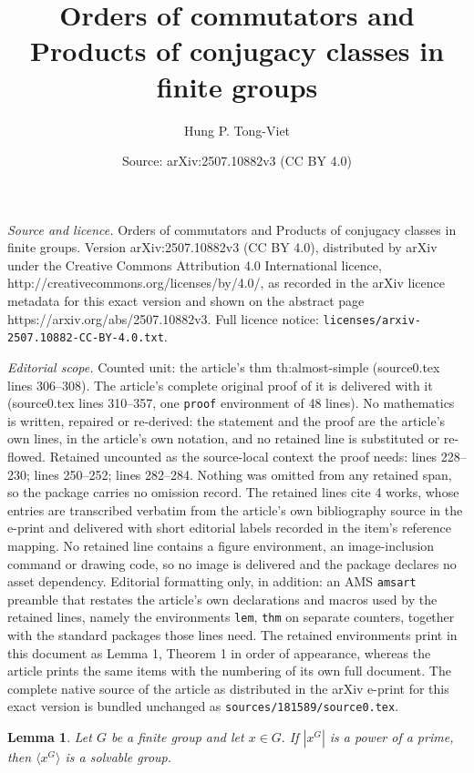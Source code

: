 \documentclass[10pt,a4paper]{amsart}
\title{Orders of commutators and Products of conjugacy classes in finite groups}
\author{Hung P. Tong-Viet}
\date{Source: arXiv:2507.10882v3 (CC BY 4.0)}
\newtheorem{lem}{Lemma}
\newcommand{\la}{\langle}
\newcommand{\ra}{\rangle}
\begin{document}
\maketitle

\noindent\emph{Source and licence.} Orders of commutators and Products of conjugacy classes in finite groups. Version arXiv:2507.10882v3 (CC BY 4.0), distributed by arXiv under the Creative Commons Attribution 4.0 International licence, http://creativecommons.org/licenses/by/4.0/, as recorded in the arXiv licence metadata for this exact version and shown on the abstract page https://arxiv.org/abs/2507.10882v3. Full licence notice: \texttt{licenses/arxiv-2507.10882-CC-BY-4.0.txt}.\par\smallskip

\noindent\textit{Editorial scope.} Counted unit: the article's thm th:almost-simple (source0.tex lines 306--308). The article's complete original proof of it is delivered with it (source0.tex lines 310--357, one \texttt{proof} environment of 48 lines). No mathematics is written, repaired or re-derived: the statement and the proof are the article's own lines, in the article's own notation, and no retained line is substituted or re-flowed.  Retained uncounted as the source-local context the proof needs: lines 228--230; lines 250--252; lines 282--284.  Nothing was omitted from any retained span, so the package carries no omission record.  The retained lines cite 4 works, whose entries are transcribed verbatim from the article's own bibliography source in the e-print and delivered with short editorial labels recorded in the item's reference mapping.  No retained line contains a figure environment, an image-inclusion command or drawing code, so no image is delivered and the package declares no asset dependency.  Editorial formatting only, in addition: an AMS \texttt{amsart} preamble that restates the article's own declarations and macros used by the retained lines, namely the environments \texttt{lem}, \texttt{thm} on separate counters, together with the standard packages those lines need.  The retained environments print in this document as Lemma 1, Theorem 1 in order of appearance, whereas the article prints the same items with the numbering of its own full document.  The complete native source of the article as distributed in the arXiv e-print for this exact version is bundled unchanged as \texttt{sources/181589/source0.tex}.
\begin{lem}\label{lem:pa}
Let $G$ be a finite group and let $x\in G.$ If $|x^G|$ is a power of a prime, then $\la x^G\ra$ is a solvable group.
\end{lem}
\end{document}
